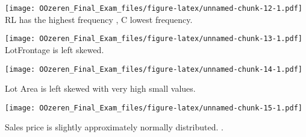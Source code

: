\documentclass[]{article}
\newenvironment{Shaded}{\begin{snugshade}}{\end{snugshade}}
\newcommand{\KeywordTok}[1]{\textcolor[rgb]{0.13,0.29,0.53}{\textbf{#1}}}
\newcommand{\DataTypeTok}[1]{\textcolor[rgb]{0.13,0.29,0.53}{#1}}
\newcommand{\StringTok}[1]{\textcolor[rgb]{0.31,0.60,0.02}{#1}}
\newcommand{\OperatorTok}[1]{\textcolor[rgb]{0.81,0.36,0.00}{\textbf{#1}}}
\newcommand{\NormalTok}[1]{#1}
\begin{document}
\begin{Shaded}
\end{Shaded}

\texttt{[image: OOzeren\_Final\_Exam\_files/figure-latex/unnamed-chunk-12-1.pdf]}
RL has the highest frequency , C lowest frequency.

\begin{Shaded}
\end{Shaded}

\texttt{[image: OOzeren\_Final\_Exam\_files/figure-latex/unnamed-chunk-13-1.pdf]}
LotFrontage is left skewed.

\begin{Shaded}
\end{Shaded}

\texttt{[image: OOzeren\_Final\_Exam\_files/figure-latex/unnamed-chunk-14-1.pdf]}

Lot Area is left skewed with very high small values.

\begin{Shaded}
\end{Shaded}

\texttt{[image: OOzeren\_Final\_Exam\_files/figure-latex/unnamed-chunk-15-1.pdf]}

Sales price is slightly approximately normally distributed. .
\end{document}
